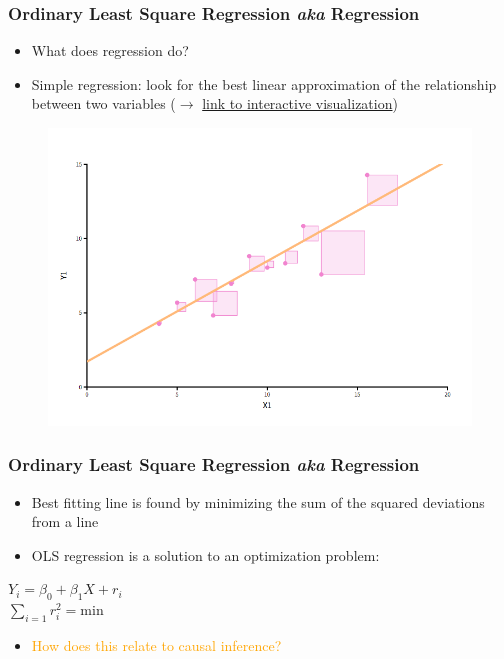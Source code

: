 \documentclass[12pt,english,dvipsnames,aspectratio=169,handout]{beamer}\usepackage[]{graphicx}\usepackage[]{xcolor}
\begin{document}
\begin{frame}
  \frametitle{Ordinary Least Square Regression \emph{aka} Regression}
	\begin{itemize}
		\item What does regression do?  
		\item Simple regression: look for the best linear approximation of the relationship between two variables ($\rightarrow$ \href{https://students.brown.edu/seeing-theory/regression-analysis/index.html}{link to interactive visualization})
	\end {itemize}
	 \begin{figure} 
    \includegraphics[height=.5\textheight]{../04-figures/03/01-simple_ols}
    \end{figure}
    
\end{frame}


\begin{frame}
\frametitle{Ordinary Least Square Regression \emph{aka} Regression}

\begin{itemize}
	\item Best fitting line is found by minimizing the sum of the squared deviations from a line 
  \item OLS regression is a solution to an optimization problem:
	\end {itemize}
  \begin{center}
  $Y_{i} = \beta_{0} + \beta_{1}X + r_{i}$ \\
  $\sum_{i=1}r_{i}^{2} = \text{min}$
  \end{center}
  \pause
\begin{itemize}
		\item \textcolor{orange}{How does this relate to causal inference?}
	\end {itemize}
	
\end{frame}
\end{document}

